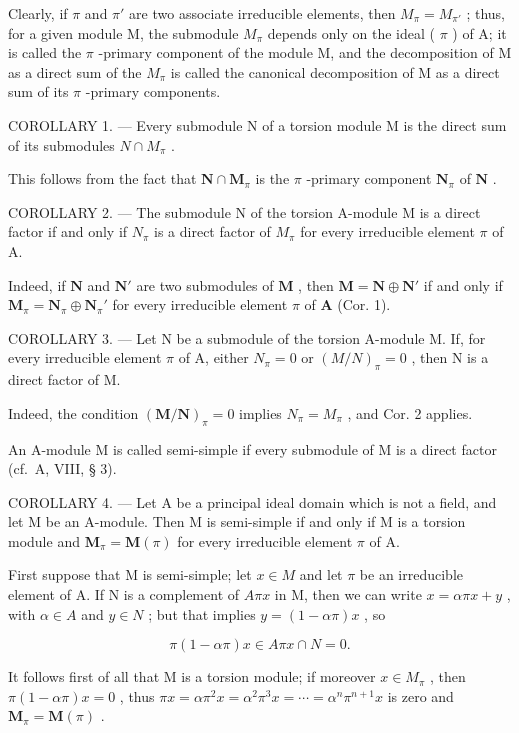 Clearly, if \(\pi\) and \(\pi'\) are two associate irreducible elements, then \(M_{\pi} = M_{\pi'}\) ; thus, for a given module M, the submodule \(M_{\pi}\) depends only on the ideal ( \(\pi\) ) of A; it is called the \(\pi\) -primary component of the module M, and the decomposition of M as a direct sum of the \(M_{\pi}\) is called the canonical decomposition of M as a direct sum of its \(\pi\) -primary components.

COROLLARY 1. --- Every submodule N of a torsion module M is the direct sum of its submodules \(N \cap M_{\pi}\) .

This follows from the fact that \(\mathbf{N} \cap \mathbf{M}_{\pi}\) is the \(\pi\) -primary component \(\mathbf{N}_{\pi}\) of \(\mathbf{N}\) .

COROLLARY 2. --- The submodule N of the torsion A-module M is a direct factor if and only if \(N_{\pi}\) is a direct factor of \(M_{\pi}\) for every irreducible element \(\pi\) of A.

Indeed, if \(\mathbf{N}\) and \(\mathbf{N}'\) are two submodules of \(\mathbf{M}\) , then \(\mathbf{M} = \mathbf{N} \oplus \mathbf{N}'\) if and only if \(\mathbf{M}_{\pi} = \mathbf{N}_{\pi} \oplus \mathbf{N}_{\pi}'\) for every irreducible element \(\pi\) of \(\mathbf{A}\) (Cor. 1).

COROLLARY 3. --- Let N be a submodule of the torsion A-module M. If, for every irreducible element \(\pi\) of A, either \(N_{\pi} = 0\) or \((M/N)_{\pi} = 0\) , then N is a direct factor of M.

Indeed, the condition \((\mathbf{M}/\mathbf{N})_{\pi}=0\) implies \(N_{\pi}=M_{\pi}\) , and Cor. 2 applies.

An A-module M is called semi-simple if every submodule of M is a direct factor (cf.~A, VIII, § 3).

COROLLARY 4. --- Let A be a principal ideal domain which is not a field, and let M be an A-module. Then M is semi-simple if and only if M is a torsion module and \(\mathbf{M}_{\pi} = \mathbf{M}(\pi)\) for every irreducible element \(\pi\) of A.

First suppose that M is semi-simple; let \(x \in M\) and let \(\pi\) be an irreducible element of A. If N is a complement of \(A\pi x\) in M, then we can write \(x = \alpha\pi x + y\) , with \(\alpha \in A\) and \(y \in N\) ; but that implies \(y = (1 - \alpha\pi)x\) , so

\[
\pi (1 - \alpha \pi) x \in A \pi x \cap N = 0.
\]

It follows first of all that M is a torsion module; if moreover \(x \in M_{\pi}\) , then \(\pi(1 - \alpha\pi)x = 0\) , thus \(\pi x = \alpha\pi^{2}x = \alpha^{2}\pi^{3}x = \cdots = \alpha^{n}\pi^{n+1}x\) is zero and \(\mathbf{M}_{\pi} = \mathbf{M}(\pi)\) .

